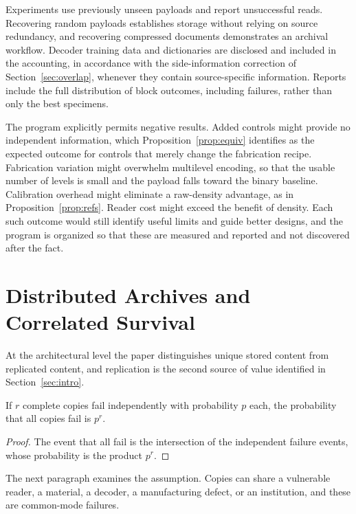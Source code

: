 Experiments use previously unseen payloads and report unsuccessful reads. Recovering random payloads establishes storage without relying on source redundancy, and recovering compressed documents demonstrates an archival workflow. Decoder training data and dictionaries are disclosed and included in the accounting, in accordance with the side-information correction of Section~\ref{sec:overlap}, whenever they contain source-specific information. Reports include the full distribution of block outcomes, including failures, rather than only the best specimens.

The program explicitly permits negative results. Added controls might provide no independent information, which Proposition~\ref{prop:equiv} identifies as the expected outcome for controls that merely change the fabrication recipe. Fabrication variation might overwhelm multilevel encoding, so that the usable number of levels is small and the payload falls toward the binary baseline. Calibration overhead might eliminate a raw-density advantage, as in Proposition~\ref{prop:refs}. Reader cost might exceed the benefit of density. Each such outcome would still identify useful limits and guide better designs, and the program is organized so that these are measured and reported and not discovered after the fact.

\section{Distributed Archives and Correlated Survival}\label{sec:distribution}

At the architectural level the paper distinguishes unique stored content from replicated content, and replication is the second source of value identified in Section~\ref{sec:intro}.

\begin{proposition}\label{prop:repl}
If $r$ complete copies fail independently with probability $p$ each, the probability that all copies fail is $p^{r}$.
\end{proposition}

\begin{proof}
The event that all fail is the intersection of the independent failure events, whose probability is the product $p^{r}$.
\end{proof}

The next paragraph examines the assumption. Copies can share a vulnerable reader, a material, a decoder, a manufacturing defect, or an institution, and these are common-mode failures.

